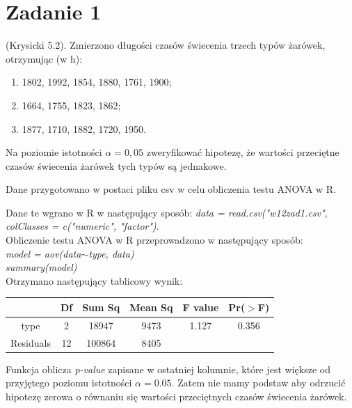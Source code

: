\documentclass{article}
\begin{document}
\section{Zadanie 1}
(Krysicki 5.2). Zmierzono długości czasów świecenia trzech typów żarówek, otrzymując (w h):
\begin{enumerate}[label = dla typu \arabic*:]
\item 1802, 1992, 1854, 1880, 1761, 1900;
\item 1664, 1755, 1823, 1862;
\item 1877, 1710, 1882, 1720, 1950.
\end{enumerate}
Na poziomie istotności $\alpha=0,05$ zweryfikować hipotezę, że wartości przeciętne czasów świecenia żarówek tych typów są jednakowe. \\ \par

Dane przygotowano w postaci pliku csv w celu obliczenia testu ANOVA w R.
\begin{center}
\end{center}

Dane te wgrano w R w następujący sposób: \textit{data = read.csv("w12zad1.csv", colClasses = c("numeric", "factor")}. \\
Obliczenie testu ANOVA w R przeprowadzono w następujący sposób: \\
\textit{model = aov(data$\sim$type, data)} \\
\textit{summary(model)} \\
Otrzymano następujący tablicowy wynik:

\begin{center} \begin{tabular}{|c|c|c|c|c|c|} \hline
& Df & Sum Sq & Mean Sq & F value & Pr($>$F) \\ \hline
type & 2 & 18947 & 9473 & 1.127 & 0.356 \\ \hline
Residuals & 12 & 100864 & 8405 & & \\ \hline
\end{tabular} \end{center}

Funkcja oblicza \textit{p-value} zapisane w ostatniej kolumnie, które jest większe od przyjętego poziomu istotności $\alpha=0.05$. Zatem nie mamy podstaw aby odrzucić hipotezę zerowa o równaniu się wartości przeciętnych czasów świecenia żarówek.
\end{document}
